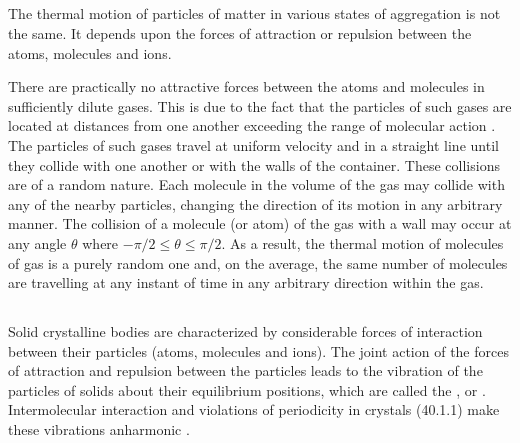 \subsection{}\label{8.1.3} The thermal motion of particles of matter in various states of aggregation is not the same. It depends upon the forces of attraction or repulsion between the atoms, molecules and ions.

There are practically no attractive forces between the atoms and molecules in sufficiently dilute gases. This is due to the fact that the particles of such gases are located at distances from one another exceeding the range of molecular action . The particles of such gases travel at uniform velocity and in a straight line until they collide with one another or with the walls of the container. These collisions are of a random nature. Each molecule in the volume of the gas may collide with any of the nearby particles, changing the direction of its motion in any arbitrary manner. The collision of a molecule (or atom) of the gas with a wall may occur at any angle $\theta$ where
$-\pi/2 \leqslant \theta \leqslant \pi/2$. As a result, the thermal motion of molecules of gas is a purely random one and, on the average, the same number of molecules are travelling at any instant of time in any arbitrary direction within the gas.

\subsection{}\label{8.1.4} Solid crystalline bodies are characterized by considerable forces of interaction between their particles (atoms, molecules and ions). The joint action of the forces of attraction and repul­sion between the particles  leads to the vibration of the particles of solids about their equilibrium positions, which are called the , or  . Intermolecular interaction and violations of periodicity in crystals (40.1.1) make these vibrations anharmonic . 

